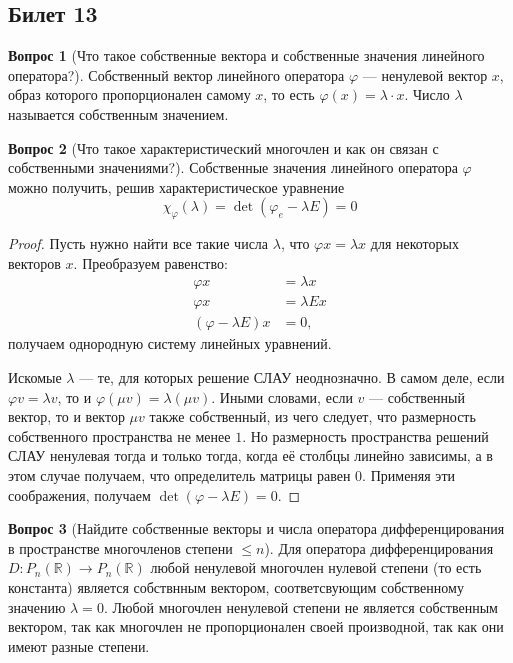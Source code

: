 \documentclass[a4paper,11pt]{article}
\theoremstyle{remark}
\theoremstyle{definition}
\newtheorem{question}{Вопрос}
\numberwithin{question}{subsection}
\begin{document}
\subsection{Билет 13}
\begin{question}[Что такое собственные вектора и собственные значения линейного оператора?]
Собственный вектор линейного оператора \(\varphi\) --- ненулевой вектор \(x\), образ которого пропорционален самому \(x\), то есть \(\varphi(x) = \lambda \cdot x\). Число \(\lambda\) называется собственным значением.
\end{question}

\begin{question}[Что такое характеристический многочлен и как он связан с собственными значениями?]
Собственные значения линейного оператора \(\varphi\) можно получить, решив характеристическое уравнение 
\begin{equation*}
	\chi_\varphi (\lambda) = \det (\varphi_e - \lambda E) = 0
\end{equation*}

\begin{proof}
Пусть нужно найти все такие числа \(\lambda\), что \(\varphi x = \lambda x\) для некоторых векторов \(x\). Преобразуем равенство:
\begin{align*}
	\varphi x &= \lambda x \\
	\varphi x &= \lambda E x \\
	(\varphi - \lambda E)x &= 0,
\end{align*}
получаем однородную систему линейных уравнений.

Искомые \(\lambda\) --- те, для которых решение СЛАУ неоднозначно. В самом деле, если \(\varphi v = \lambda v\), то и \(\varphi (\mu v) = \lambda (\mu v)\). Иными словами, если \(v\) --- собственный вектор, то и вектор \(\mu v\) также собственный, из чего следует, что размерность собственного пространства не менее \(1\). Но размерность пространства решений СЛАУ ненулевая тогда и только тогда, когда её столбцы линейно зависимы, а в этом случае получаем, что определитель матрицы равен 0. Применяя эти соображения, получаем \(\det (\varphi - \lambda E) = 0\).
\end{proof}
\end{question}

\begin{question}[Найдите собственные векторы и числа оператора дифференцирования в пространстве многочленов степени \(\leqslant n\)]
Для оператора дифференцирования \(D: P_n(\mathbb{R}) \rightarrow P_n(\mathbb{R})\) любой ненулевой многочлен нулевой степени (то есть константа) является собствнным вектором, соответсвующим собственному значению \(\lambda = 0\). Любой многочлен ненулевой степени не является собственным вектором, так как многочлен не пропорционален своей производной, так как они имеют разные степени.
\end{question}
\end{document}
